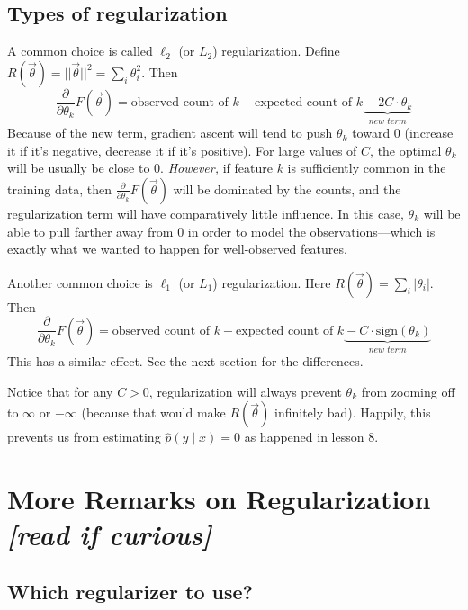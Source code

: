 \documentclass[11pt]{article}
\newcommand{\vtheta}{\vec{\theta}}
\newcommand{\ph}{\hat{p}}
\newcommand{\diffk}{\frac{\partial}{\partial \theta_k}}
\begin{document}
\subsection{Types of regularization}

A common choice is called $\ell_2$ (or $L_2$) regularization.  Define
$R(\vtheta) = ||\vtheta||^2 = \sum_i \theta_i^2$.  Then
\begin{equation}
  \diffk F(\vtheta) = \textrm{observed count of $k$} -
  \textrm{expected count of $k$} \underbrace{\mbox{}-2C \cdot
    \theta_k}_{\textit{new term}}
\end{equation}
Because of the new term, gradient ascent will tend to push $\theta_k$
toward 0 (increase it if it's negative, decrease it if it's positive).
For large values of $C$, the optimal $\theta_k$ will be usually be
close to 0.  {\em However,} if feature $k$ is sufficiently common in the
training data, then $\diffk F(\vtheta)$ will be dominated by the
counts, and the regularization term will have comparatively little
influence.  In this case, $\theta_k$ will be able to pull farther away
from 0 in order to model the observations---which is exactly what we
wanted to happen for well-observed features.

Another common choice is $\ell_1$ (or $L_1$) regularization.  Here
$R(\vtheta) = \sum_i |\theta_i|$.  Then
\begin{equation}
  \diffk F(\vtheta) = \textrm{observed count of $k$} -
  \textrm{expected count of $k$} \underbrace{\mbox{}-C\cdot \textrm{sign}(\theta_k)}_{\textit{new term}}
\end{equation}
This has a similar effect.  See the next section for the differences.

Notice that for any $C > 0$, regularization will always prevent
$\theta_k$ from zooming off to $\infty$ or $-\infty$ (because that
would make $R(\vtheta)$ infinitely bad).  Happily, this prevents us from
estimating $\ph(y\mid x)=0$ as happened in lesson 8.

\section{More Remarks on Regularization {\em [read if curious]}}

\subsection{Which regularizer to use?}

%
\end{document}
